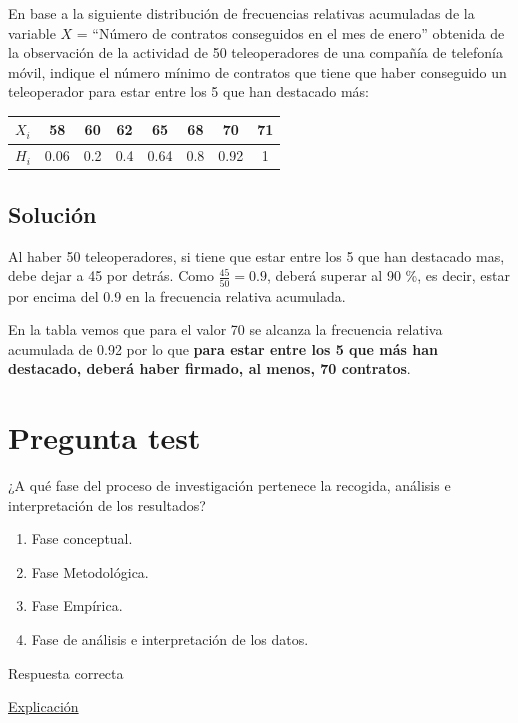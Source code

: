 \documentclass[
]{book}
\providecommand{\tightlist}{%
  \setlength{\itemsep}{0pt}\setlength{\parskip}{0pt}}
\begin{document}
En base a la siguiente distribución de frecuencias relativas acumuladas de la variable \(X\) = ``Número de contratos conseguidos en el mes de enero'' obtenida de la observación de la actividad de 50 teleoperadores de
una compañía de telefonía móvil, indique el número mínimo de contratos que tiene que haber conseguido un teleoperador para estar entre los 5 que han destacado más:

\begin{longtable}[]{@{}cccccccc@{}}
\toprule
\(X_i\) & 58 & 60 & 62 & 65 & 68 & 70 & 71\tabularnewline
\midrule
\endhead
\(H_i\) & 0.06 & 0.2 & 0.4 & 0.64 & 0.8 & 0.92 & 1\tabularnewline
\bottomrule
\end{longtable}

\hypertarget{soluciuxf3n}{%
\subsection{Solución}\label{soluciuxf3n}}

Al haber 50 teleoperadores, si tiene que estar entre los 5 que han destacado mas, debe dejar a 45 por detrás. Como \(\frac{45}{50}=0.9\), deberá superar al 90 \%, es decir, estar por encima del 0.9 en la frecuencia relativa acumulada.

En la tabla vemos que para el valor 70 se alcanza la frecuencia relativa acumulada de 0.92 por lo que \textbf{para estar entre los 5 que más han destacado, deberá haber firmado, al menos, 70 contratos}.

\hypertarget{pregunta-test-6}{%
\section{Pregunta test}\label{pregunta-test-6}}

¿A qué fase del proceso de investigación pertenece la recogida, análisis e interpretación de los resultados?

\begin{enumerate}
\def\labelenumi{\alph{enumi})}
\tightlist
\item
  Fase conceptual.
\item
  Fase Metodológica.
\item
  Fase Empírica.
\item
  Fase de análisis e interpretación de los datos.
\end{enumerate}

Respuesta correcta

\href{https://www.salusplay.com/apuntes/apuntes-metodologia-de-la-investigacion/tema-4-el-proceso-de-investigacion-fases-de-realizacion-de-una-investigacion-cientifica/2}{Explicación}
\end{document}
